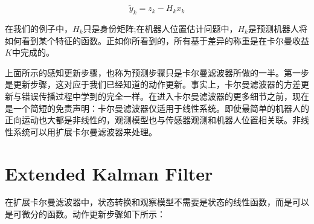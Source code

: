 \begin{equation}
\tilde{y}_{k}=z_k-H_k x_k
\end{equation}



在我们的例子中，$H_k$只是身份矩阵;在机器人位置估计问题中，$H_k$是预测机器人将如何看到某个特征的函数。正如你所看到的，所有基于差异的称重是在卡尔曼收益$K$中完成的。

上面所示的感知更新步骤，也称为预测步骤只是卡尔曼滤波器所做的一半。第一步是更新步骤，这对应于我们已经知道的动作更新。事实上，卡尔曼滤波器的方差更新与错误传播过程中学到的完全一样。在进入卡尔曼滤波器的更多细节之前，现在是一个简短的免责声明：卡尔曼滤波器仅适用于线性系统。即使最简单的机器人的正向运动也大都是非线性的，观测模型也与传感器观测和机器人位置相关联。非线性系统可以用扩展卡尔曼滤波器来处理。


\section {Extended Kalman Filter} 
\label{sec:EKF}
在扩展卡尔曼滤波器中，状态转换和观察模型不需要是状态的线性函数，而是可以是可微分的函数。动作更新步骤如下所示：

